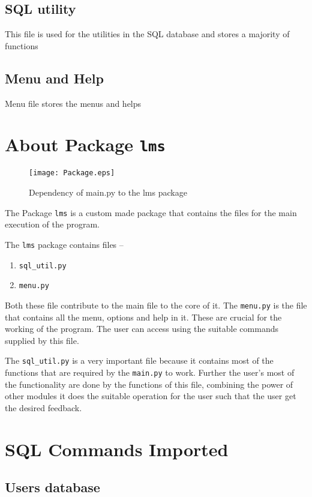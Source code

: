 \documentclass[12pt, a4paper, titlepage, openany]{report}
\begin{document}
\subsection{SQL utility}

This file is used for the utilities in the SQL database and stores a majority of functions\par

\newpage
\subsection{Menu and Help}

Menu file stores the menus and helps\par


\newpage
\section{About Package \texttt{lms}}
\begin{figure}
\centering
\texttt{[image: Package.eps]}
\caption{Dependency of main.py to the lms package}
\end{figure}

The Package \verb+lms+ is a custom made package that contains the files for the main execution of the program.

The \verb+lms+ package contains files --
\begin{enumerate}\item \verb+sql_util.py+ \item \verb+menu.py+ \end{enumerate}
Both these file contribute to the main file to the core of it. The \verb+menu.py+ is the file that contains all the menu, options and help in it. These are crucial for the working of the program. The user can access using the suitable commands supplied by this file.

The \verb+sql_util.py+ is a very important file because it contains most of the functions that are required by the \verb+main.py+ to work. Further the user's most of the functionality are done by the functions of this file, combining the power of other modules it does the suitable operation for the user such that the user get the desired feedback.
\newpage

\section{SQL Commands Imported}
\subsection{Users database}

\newpage
\end{document}
